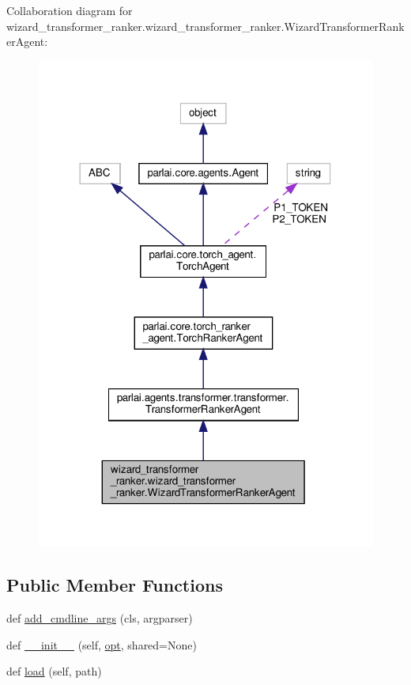 Collaboration diagram for wizard\+\_\+transformer\+\_\+ranker.\+wizard\+\_\+transformer\+\_\+ranker.\+Wizard\+Transformer\+Ranker\+Agent\+:
\nopagebreak
\begin{figure}[H]
\begin{center}
\leavevmode
\includegraphics[width=318pt]{classwizard__transformer__ranker_1_1wizard__transformer__ranker_1_1WizardTransformerRankerAgent__coll__graph}
\end{center}
\end{figure}
\subsection*{Public Member Functions}
\begin{DoxyCompactItemize}
\item 
def \hyperlink{classwizard__transformer__ranker_1_1wizard__transformer__ranker_1_1WizardTransformerRankerAgent_aa85f7625d15a4839dd4c887985f54ca1}{add\+\_\+cmdline\+\_\+args} (cls, argparser)
\item 
def \hyperlink{classwizard__transformer__ranker_1_1wizard__transformer__ranker_1_1WizardTransformerRankerAgent_af70ab88a1dd902b8bd2578e8314f64f8}{\+\_\+\+\_\+init\+\_\+\+\_\+} (self, \hyperlink{classparlai_1_1core_1_1torch__agent_1_1TorchAgent_a785bb920cf8c8afc3e9bf6a8b77e335a}{opt}, shared=None)
\item 
def \hyperlink{classwizard__transformer__ranker_1_1wizard__transformer__ranker_1_1WizardTransformerRankerAgent_a0dc84b46e7df927db8235f2f2a48f5b0}{load} (self, path)
\end{DoxyCompactItemize}
